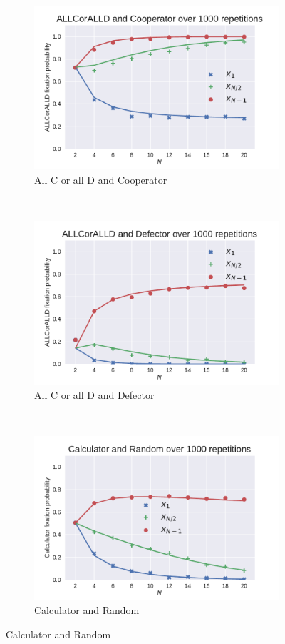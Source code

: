 \documentclass{article}
\begin{document}
\begin{figure}[!hbtp]
    \begin{subfigure}[t]{.3\textwidth}
        \centering
        \includegraphics[width=.8\textwidth]{./img/ALLCorALLD_v_Cooperator.pdf}
        \caption{All C or all D and Cooperator}
    \end{subfigure}%
    ~
    \begin{subfigure}[t]{.3\textwidth}
        \centering
        \includegraphics[width=.8\textwidth]{./img/ALLCorALLD_v_Defector.pdf}
        \caption{All C or all D and Defector}
    \end{subfigure}%
    ~
    \begin{subfigure}[t]{.3\textwidth}
        \centering
        \includegraphics[width=.8\textwidth]{./img/Calculator_v_Random.pdf}
        \caption{Calculator and Random}
    \end{subfigure}%


\end{figure}
\end{document}

